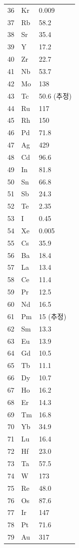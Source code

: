 \documentclass[12pt,a4paper]{article}
\begin{document}
\begin{longtable}{p{0.6cm}p{1.2cm}p{1.5cm}}
		36 & Kr & 0.009 \\
		37 & Rb & 58.2 \\
		38 & Sr & 35.4 \\
		39 & Y  & 17.2 \\
		40 & Zr & 22.7 \\
		41 & Nb & 53.7 \\
		42 & Mo & 138 \\
		43 & Tc & 50.6 (추정) \\
		44 & Ru & 117 \\
		45 & Rh & 150 \\
		46 & Pd & 71.8 \\
		47 & Ag & 429 \\
		48 & Cd & 96.6 \\
		49 & In & 81.8 \\
		50 & Sn & 66.8 \\
		51 & Sb & 24.3 \\
		52 & Te & 2.35 \\
		53 & I  & 0.45 \\
		54 & Xe & 0.005 \\
		55 & Cs & 35.9 \\
		56 & Ba & 18.4 \\
		57 & La & 13.4 \\
		58 & Ce & 11.4 \\
		59 & Pr & 12.5 \\
		60 & Nd & 16.5 \\
		61 & Pm & 15 (추정) \\
		62 & Sm & 13.3 \\
		63 & Eu & 13.9 \\
		64 & Gd & 10.5 \\
		65 & Tb & 11.1 \\
		66 & Dy & 10.7 \\
		67 & Ho & 16.2 \\
		68 & Er & 14.3 \\
		69 & Tm & 16.8 \\
		70 & Yb & 34.9 \\
		71 & Lu & 16.4 \\
		72 & Hf & 23.0 \\
		73 & Ta & 57.5 \\
		74 & W  & 173 \\
		75 & Re & 48.0 \\
		76 & Os & 87.6 \\
		77 & Ir & 147 \\
		78 & Pt & 71.6 \\
		79 & Au & 317 \\

\end{longtable}
\end{document}
